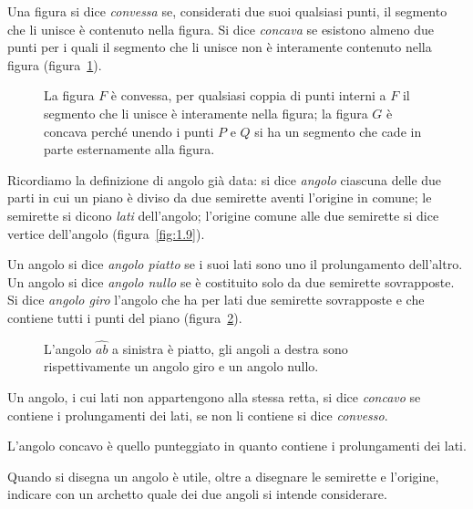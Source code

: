 {\begin{definizione}
Una figura si dice \emph{convessa} se, considerati due suoi qualsiasi punti, il segmento che li unisce è contenuto nella figura. Si dice \emph{concava} se esistono almeno due punti per i quali il segmento che li unisce non è interamente contenuto nella figura (figura~\ref{fig:1.18}).
\end{definizione}
\begin{figure}[b,t,h]
 \centering 
 \caption{La figura $ F $ è convessa, per qualsiasi coppia di punti interni a $ F $ il segmento che li unisce è interamente nella figura; la figura $ G $ è concava perché unendo i punti $ P $ e $ Q $ si ha un segmento che cade in parte esternamente alla figura.}\label{fig:1.18}
\end{figure}

Ricordiamo la definizione di angolo già data: si dice \emph{angolo} ciascuna delle due parti in cui un piano è diviso da due semirette aventi l'origine in comune; le semirette si dicono \emph{lati} dell'angolo; l'origine comune alle due semirette si dice vertice dell'angolo (figura~\ref{fig:1.9}).

\begin{definizione}
Un angolo si dice \emph{angolo piatto} se i suoi lati sono uno il prolungamento dell'altro.
Un angolo si dice \emph{angolo nullo} se è costituito solo da due semirette sovrapposte.
Si dice \emph{angolo giro} l'angolo che ha per lati due semirette sovrapposte e che contiene tutti i punti del piano (figura~\ref{fig:1.19}).
\end{definizione}
\begin{figure}[b,t,h]
 \centering 
 \caption{L'angolo  $\widehat{ab}$ a sinistra è piatto, gli angoli a destra sono rispettivamente un angolo giro e un angolo nullo.}\label{fig:1.19}
\end{figure}

\begin{definizione}
Un angolo, i cui lati non appartengono alla stessa retta, si dice \emph{concavo} se contiene i prolungamenti dei lati, se non li contiene si dice \emph{convesso}.
\end{definizione}

L'angolo concavo è quello punteggiato in quanto contiene i prolungamenti dei lati.

Quando si disegna un angolo è utile, oltre a disegnare le semirette e l'origine, indicare con un archetto quale dei due angoli si intende considerare.

}
